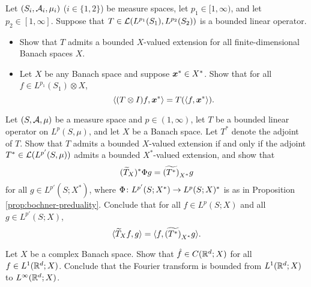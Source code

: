 \begin{exercise}\label{ex:tensor-extension-basic-props}
  Let $(S_i, \mathcal{A}_i, \mu_i)$ ($i \in \{1,2\}$) be measure spaces, let $p_1 \in [1,\infty)$, and let $p_2 \in [1,\infty]$.
  Suppose that $T \in \mathcal{L}(L^{p_1}(S_1), L^{p_2}(S_2))$ is a bounded linear operator.
  \begin{itemize}
  \item
    Show that $T$ admits a bounded $X$-valued extension for all finite-dimensional Banach spaces $X$.
  \item
    Let $X$ be any Banach space and suppose $\bm{x}^* \in X^*$.
    Show that for all $f \in L^{p_1}(S_1) \otimes X$,
    \begin{equation*}
      \langle (T \otimes I)f, \bm{x}^* \rangle = T(\langle f, \bm{x}^* \rangle).
    \end{equation*}
  \end{itemize}

\end{exercise}

\begin{exercise}\label{ex:tensor-adjoint}
  Let $(S,\mathcal{A},\mu)$ be a measure space and $p \in (1,\infty)$, let $T$ be a bounded linear operator on $L^p(S,\mu)$, and let $X$ be a Banach space.
  Let $T^*$ denote the adjoint of $T$.
  Show that $T$ admits a bounded $X$-valued extension if and only if the adjoint $T^* \in \mathcal{L}(L^{p'}(S,\mu))$ admits a bounded $X^*$-valued extension, and show that
  \begin{equation*}
    (\widetilde{T}_X)^* \Phi g = \widetilde{(T^*)}_{X^*} g
  \end{equation*}
  for all $g \in L^{p'}(S;X^*)$, where $\Phi \colon L^{p'}(S;X^*) \rightarrow L^p(S;X)^*$ is as in Proposition \ref{prop:bochner-preduality}.
  Conclude that for all $f \in L^p(S;X)$ and all $g \in L^{p'}(S;X)$,
  \begin{equation}\label{eq:tensor-adjoint-identity}
    \langle \widetilde{T}_X f, g \rangle = \langle f, \widetilde{(T^*)}_{X^*} g \rangle.
  \end{equation}
\end{exercise}

\begin{exercise}\label{ex:FT-bounded-1-infty}
  Let $X$ be a complex Banach space.
  Show that $\hat{f} \in C(\mathbb{R}^d;X)$ for all $f \in L^1(\mathbb{R}^d;X)$.
  Conclude that the Fourier transform is bounded from $L^1(\mathbb{R}^d;X)$ to $L^\infty(\mathbb{R}^d;X)$.
\end{exercise}

